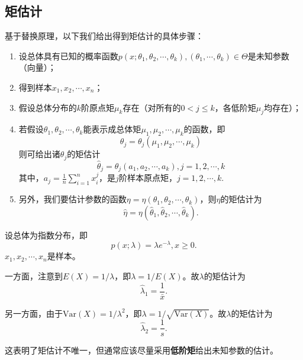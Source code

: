 \subsection{矩估计}
基于替换原理，以下我们给出得到矩估计的具体步骤：
 \begin{enumerate}
        \item 设总体具有已知的概率函数$p(x;\theta_{1},\theta_{2},\cdots,\theta_{k}),(\theta_{1},\cdots,\theta_{k})\in \Theta$是未知参数（向量）；
        \item 得到样本$x_{1},x_{2},\cdots,x_{n}$；
        \item 假设总体分布的$k$阶原点矩$\mu_{k}$存在（对所有的$0<j\leq k$，各低阶矩$\mu_{j}$均存在）；
        \item 若假设$\theta_{1},\theta_{2},\cdots,\theta_{k}$能表示成总体矩$\mu_{1},\mu_{2},\cdots,\mu_{k}$的函数，即$$\theta_{j}=\theta_{j}(\mu_{1},\mu_{2},\cdots,\mu_{k})$$则可给出诸$\theta_{j}$的矩估计$$\hat{\theta}_{j}=\theta_{j}(a_{1},a_{2},\cdots,a_{k}),j=1,2,\cdots,k$$其中，$a_{j}=\frac{1}{n}\sum_{i=1}^{n}x_{i}^{j}$，是$j$阶样本原点矩，$j=1,2,\cdots,k.$
        \item 另外，我们要估计参数的函数$\eta  =\eta (\theta _{1} ,\theta _{2} ,\cdots ,\theta _{k})$，则$\eta$的矩估计为
        $$\hat{\eta  } =\eta (\hat{\theta}_{1} ,\hat{\theta }_{2} ,\cdots ,\hat{\theta}_{k}).$$
    \end{enumerate}

\begin{example}
设总体为指数分布，即
$$
p(x;\lambda) = \lambda e^{-\lambda}, x\geq 0.
$$
$x_1,x_2,\cdots,x_n$是样本。

一方面，注意到$E(X) = 1/\lambda$，即$\lambda= 1/E(X)$。故$\lambda$的矩估计为
    $$
    \hat{\lambda}_1 = \frac{1}{\bar{x}}.
    $$

另一方面，由于$\text{Var}(X) = 1/\lambda^2$，即$\lambda = 1/\sqrt{\text{Var}(X)}$。故$\lambda$的矩估计为
    $$
    \hat{\lambda}_2 = \frac{1}{s}.
    $$
\end{example}
\begin{remark}
    这表明了矩估计不唯一，但通常应该尽量采用\textbf{低阶矩}给出未知参数的估计。
\end{remark}

